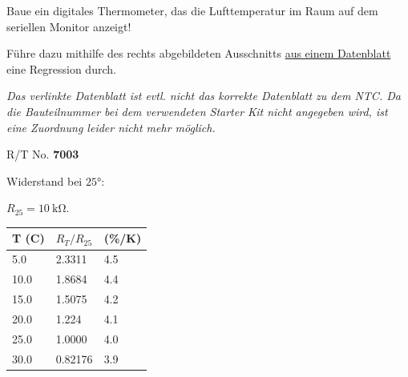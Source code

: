 \begin{projekt}\label{proj:thermometer}
	\begin{minipage}{0.58\textwidth}
		Baue ein digitales Thermometer, das die Lufttemperatur im Raum auf dem seriellen Monitor anzeigt!
		
		\bigskip
		Führe dazu mithilfe des rechts abgebildeten Ausschnitts \href{https://pdf1.alldatasheet.com/datasheet-pdf/view/509832/EPCOS/G1541.html}{aus einem Datenblatt} eine Regression durch.
		
		\bigskip
		\textit{\small Das verlinkte Datenblatt ist evtl. nicht das korrekte Datenblatt zu dem NTC. Da die Bauteilnummer bei dem verwendeten Starter Kit nicht angegeben wird, ist eine Zuordnung leider nicht mehr möglich.}

		\vspace{\baselineskip}
	\end{minipage}
	\hfill
	\begin{minipage}{0.38\textwidth}
		\begin{tcolorbox}
			R/T No. \textbf{7003}
			
			Widerstand bei $\ang{25}$: 
			
			$R_{25}=\SI{10}{\kilo\ohm}$.\\			
			
			\begin{tabular}{l | l | l}
				T (C) & $R_T/R_{25}$ & (\%/K) \\ \hline
				5.0 & 2.3311 & 4.5 \\ \hline
				10.0 & 1.8684 & 4.4  \\ \hline
				15.0 & 1.5075 &  4.2 \\ \hline
				20.0 & 1.224 & 4.1 \\ \hline
				25.0 & 1.0000 & 4.0 \\ \hline
				30.0 & 0.82176 & 3.9 \\ \hline
			\end{tabular}
		\end{tcolorbox}
	\end{minipage}
\end{projekt}

